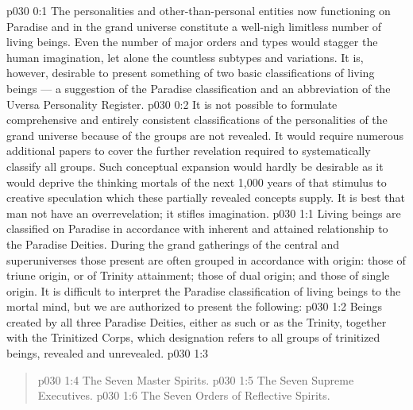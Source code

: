 \author{Mighty Messenger}
\vs p030 0:1 The personalities and other\hyp{}than\hyp{}personal entities now functioning on Paradise and in the grand universe constitute a well\hyp{}nigh limitless number of living beings. Even the number of major orders and types would stagger the human imagination, let alone the countless subtypes and variations. It is, however, desirable to present something of two basic classifications of living beings --- a suggestion of the Paradise classification and an abbreviation of the Uversa Personality Register.
\vs p030 0:2 It is not possible to formulate comprehensive and entirely consistent classifications of the personalities of the grand universe because  of the groups are not revealed. It would require numerous additional papers to cover the further revelation required to systematically classify all groups. Such conceptual expansion would hardly be desirable as it would deprive the thinking mortals of the next 1,000 years of that stimulus to creative speculation which these partially revealed concepts supply. It is best that man not have an overrevelation; it stifles imagination.
\vs p030 1:1 Living beings are classified on Paradise in accordance with inherent and attained relationship to the Paradise Deities. During the grand gatherings of the central and superuniverses those present are often grouped in accordance with origin: those of triune origin, or of Trinity attainment; those of dual origin; and those of single origin. It is difficult to interpret the Paradise classification of living beings to the mortal mind, but we are authorized to present the following:
\vsetspace
\vs p030 1:2 \bibnobreakspace {} Beings created by all three Paradise Deities, either as such or as the Trinity, together with the Trinitized Corps, which designation refers to all groups of trinitized beings, revealed and unrevealed.
\vsetspace
\vs p030 1:3 \bibnobreakspace {}
\begin{quote}
\vs p030 1:4 \bibnobreakspace The Seven Master Spirits.
\vs p030 1:5 \bibnobreakspace The Seven Supreme Executives.
\vs p030 1:6 \bibnobreakspace The Seven Orders of Reflective Spirits.
\end{quote}
